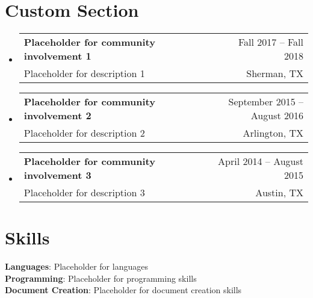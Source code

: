 \documentclass[A4,11pt]{article}
\makeatletter
\newcommand{\CVSubheading}[4]{
  \vspace{-2pt}\item
    \begin{tabular*}{0.97\textwidth}[t]{l@{\extracolsep{\fill}}r}
      \textbf{#1} & #2 \\
      \small#3 & \small #4 \\
    \end{tabular*}\vspace{-7pt}
}
\newcommand{\CVSubHeadingListStart}{\begin{itemize}[leftmargin=0.5cm, label={}]}
\newcommand{\CVSubHeadingListEnd}{\end{itemize}}
\makeatother
\begin{document}
\section{Custom Section}
  \CVSubHeadingListStart
    \CVSubheading
      {Placeholder for community involvement 1}{Fall 2017 -- Fall 2018}
      {Placeholder for description 1}{Sherman, TX}
    \CVSubheading
      {Placeholder for community involvement 2}{September 2015 -- August 2016}
      {Placeholder for description 2}{Arlington, TX}
    \CVSubheading
      {Placeholder for community involvement 3}{April 2014 -- August 2015}
      {Placeholder for description 3}{Austin, TX}
  \CVSubHeadingListEnd

\begin{comment}
This section is compressed from the various skills sections that Euro CV
recommends.
\end{comment}

\section{Skills}
 \begin{itemize}[leftmargin=0.5cm, label={}]  
    \small{\item{\textbf{Languages}{: Placeholder for languages} \\ 
     \textbf{Programming}{: Placeholder for programming skills} \\ 
     \textbf{Document Creation}{: Placeholder for document creation skills} \\  
    }}  
 \end{itemize}
    
\end{document}
